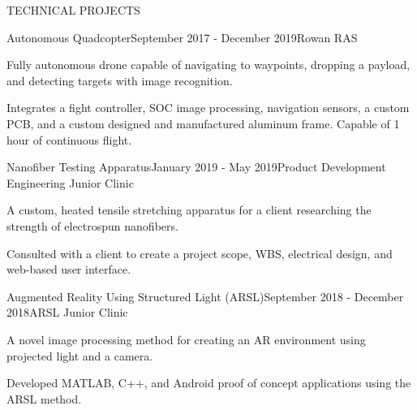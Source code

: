 \documentclass{resume} %
\begin{document}
\begin{rSection}{TECHNICAL PROJECTS}




  \begin{rSubsection}{Autonomous Quadcopter}{September 2017 - December 2019}{Rowan
    RAS}{}
  \item Fully autonomous drone capable of navigating to waypoints, dropping a
    payload, and detecting targets with image recognition.
  \item Integrates a fight controller, SOC image processing, navigation sensors,
    a custom PCB, and a custom designed and manufactured aluminum frame. Capable
    of 1 hour of continuous flight.
  \end{rSubsection}


  \begin{rSubsection}{Nanofiber Testing Apparatus}{January 2019 - May 2019}{Product Development Engineering Junior Clinic}{}
  \item A custom, heated tensile stretching apparatus for a client researching the strength of electrospun nanofibers.
  \item Consulted with a client to create a project scope, WBS, electrical
    design, and web-based user interface.
  \end{rSubsection}


  \begin{rSubsection}{Augmented Reality Using Structured Light (ARSL)}{September
    2018 - December 2018}{ARSL Junior Clinic}{}
  \item A novel image processing method for creating an AR environment using projected light and a camera.
  \item Developed MATLAB, C++, and Android proof of concept applications using the
    ARSL method.
  \end{rSubsection}



\end{rSection}
\end{document}
